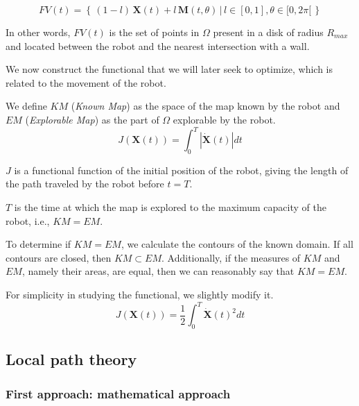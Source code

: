 \documentclass[../main.tex]{subfiles}
\begin{document}
\begin{equation}
	\displaystyle
	FV(t) = \left\{ \, (1 - l) \, \mathbf{X}(t) + l\, \mathbf{M}(t, \theta) \,|\, l \in [0, 1], \theta \in [0, 2 \pi[ \, \right\}
\end{equation}

In other words, $FV(t)$ is the set of points in $\Omega$ present in a disk of radius $R_{max}$ and located between the robot and the nearest intersection with a wall.
\vspace{0.5em}

We now construct the functional that we will later seek to optimize, which is related to the movement of the robot.
\vspace{0.5em}

We define $\mathit{KM}$ (\textit{Known Map}) as the space of the map known by the robot and $\mathit{EM}$ (\textit{Explorable Map}) as the part of $\Omega$ explorable by the robot.
\begin{equation}
	\displaystyle
	J(\mathbf{X}(t)) = \int_{0}^{T} | \mathbf{\dot{X}}(t) | dt
\end{equation}
\vspace{0.5em}

$J$ is a functional function of the initial position of the robot, giving the length of the path traveled by the robot before $t = T$.
\vspace{0.5em}

$T$ is the time at which the map is explored to the maximum capacity of the robot, i.e., $KM = EM$.
\vspace{0.5em}

To determine if $KM = EM$, we calculate the contours of the known domain. If all contours are closed, then $KM \subset EM$. Additionally, if the measures of $KM$ and $EM$, namely their areas, are equal, then we can reasonably say that $KM = EM$.
\vspace{0.5em}

For simplicity in studying the functional, we slightly modify it.
\begin{equation}
	\displaystyle
	J(\mathbf{X}(t)) = \frac{1}{2} \int_{0}^{T} \mathbf{\dot{X}}(t)^{2} dt
\end{equation}

\subsection{Local path theory}

\subsubsection{First approach: mathematical approach}
\end{document}
